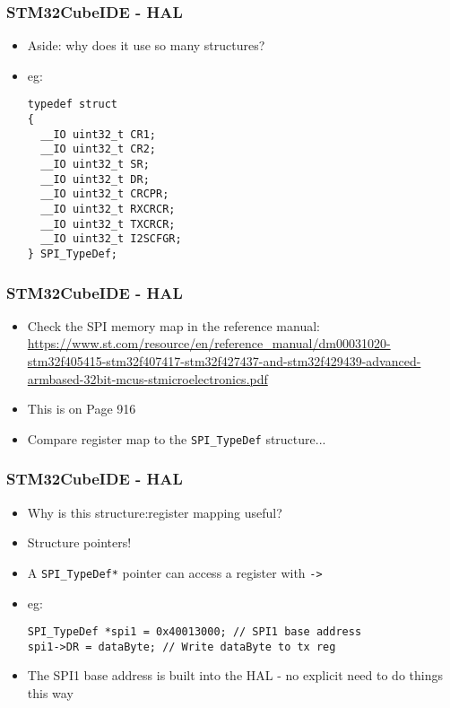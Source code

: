 \documentclass[14pt]{beamer}
\begin{document}
\begin{frame}[fragile]
\frametitle{STM32CubeIDE - HAL}
\begin{itemize}
\item Aside: why does it use so many structures?
\pause
\item eg:
\begin{lstlisting}[style=CStyle]
typedef struct
{
  __IO uint32_t CR1;
  __IO uint32_t CR2;
  __IO uint32_t SR;
  __IO uint32_t DR;
  __IO uint32_t CRCPR;
  __IO uint32_t RXCRCR;
  __IO uint32_t TXCRCR;
  __IO uint32_t I2SCFGR;
} SPI_TypeDef;
\end{lstlisting}
\end{itemize}
\end{frame}

\begin{frame}[fragile]
\frametitle{STM32CubeIDE - HAL}
\begin{itemize}
\item Check the SPI memory map in the reference manual: \url{https://www.st.com/resource/en/reference_manual/dm00031020-stm32f405415-stm32f407417-stm32f427437-and-stm32f429439-advanced-armbased-32bit-mcus-stmicroelectronics.pdf}
\item This is on Page 916
\item Compare register map to the \texttt{SPI\_TypeDef} structure...
\end{itemize}
\end{frame}

\begin{frame}[fragile]
\frametitle{STM32CubeIDE - HAL}
\begin{itemize}
\item Why is this structure:register mapping useful?
\pause
\item Structure pointers!
\item A \texttt{SPI\_TypeDef*} pointer can access a register with \texttt{->}
\item eg:
\begin{lstlisting}[style=CStyle]
SPI_TypeDef *spi1 = 0x40013000; // SPI1 base address
spi1->DR = dataByte; // Write dataByte to tx reg
\end{lstlisting}
\item The SPI1 base address is built into the HAL - no explicit need to do things this way
\end{itemize}
\end{frame}
\end{document}

